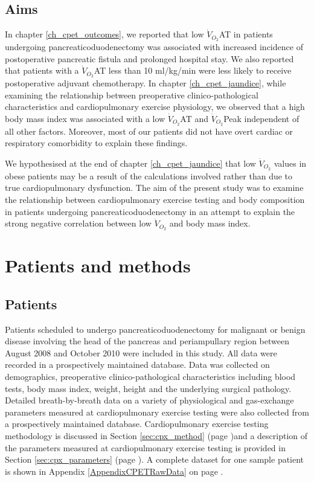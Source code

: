\subsection{Aims}
In chapter \ref{ch_cpet_outcomes}, we reported that low $\dot{V}_{O_2}$AT in patients undergoing pancreaticoduodenectomy was associated with increased incidence of postoperative pancreatic fistula and prolonged hospital stay. 
We also reported that patients with a $\dot{V}_{O_2}$AT less than 10 ml/kg/min were less likely to receive postoperative adjuvant chemotherapy.
In chapter \ref{ch_cpet_jaundice}, while examining the relationship between preoperative clinico-pathological characteristics and cardiopulmonary exercise physiology, we observed that a high body mass index was associated with a low $\dot{V}_{O_2}$AT and $\dot{V}_{O_2}$Peak independent of all other factors. 
Moreover, most of our patients did not have overt cardiac or respiratory comorbidity to explain these findings.

We hypothesised at the end of chapter \ref{ch_cpet_jaundice} that low $\dot{V}_{O_2}$ values in obese patients may be a result of the calculations involved rather than due to true cardiopulmonary dysfunction. 
The aim of the present study was to examine the relationship between cardiopulmonary exercise testing and body composition in patients undergoing pancreaticoduodenectomy in an attempt to explain the strong negative correlation between low $\dot{V}_{O_2}$ and body mass index.

\clearpage
\section{Patients and methods}

\subsection{Patients}
Patients scheduled to undergo pancreaticoduodenectomy for malignant or benign disease involving the head of the pancreas and periampullary region between August 2008 and October 2010 were included in this study. 
All data were recorded in a prospectively maintained database. 
Data was collected on demographics, preoperative clinico-pathological characteristics including blood tests, body mass index, weight, height and the underlying surgical pathology. 
Detailed breath-by-breath data on a variety of physiological and gas-exchange parameters measured at cardiopulmonary exercise testing were also collected from a prospectively maintained database. 
Cardiopulmonary exercise testing methodology is discussed in Section \ref{sec:cpx_method} (page \pageref{sec:cpx_parameters})and a description of the parameters measured at cardiopulmonary exercise testing is provided in Section \ref{sec:cpx_parameters} (page \pageref{sec:cpx_parameters}). A complete dataset for one sample patient is shown in Appendix \ref{AppendixCPETRawData} on page \pageref{AppendixCPETRawData}.

